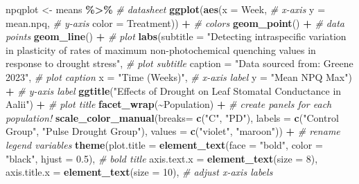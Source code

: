 \documentclass[
]{article}
\newenvironment{Shaded}{\begin{snugshade}}{\end{snugshade}}
\newcommand{\AttributeTok}[1]{\textcolor[rgb]{0.13,0.29,0.53}{#1}}
\newcommand{\CommentTok}[1]{\textcolor[rgb]{0.56,0.35,0.01}{\textit{#1}}}
\newcommand{\DecValTok}[1]{\textcolor[rgb]{0.00,0.00,0.81}{#1}}
\newcommand{\FloatTok}[1]{\textcolor[rgb]{0.00,0.00,0.81}{#1}}
\newcommand{\FunctionTok}[1]{\textcolor[rgb]{0.13,0.29,0.53}{\textbf{#1}}}
\newcommand{\NormalTok}[1]{#1}
\newcommand{\OtherTok}[1]{\textcolor[rgb]{0.56,0.35,0.01}{#1}}
\newcommand{\SpecialCharTok}[1]{\textcolor[rgb]{0.81,0.36,0.00}{\textbf{#1}}}
\newcommand{\StringTok}[1]{\textcolor[rgb]{0.31,0.60,0.02}{#1}}
\begin{document}
\begin{Shaded}
\begin{Highlighting}[]
\NormalTok{npqplot }\OtherTok{\textless{}{-}}\NormalTok{ means }\SpecialCharTok{\%\textgreater{}\%} \CommentTok{\# datasheet}
  \FunctionTok{ggplot}\NormalTok{(}\FunctionTok{aes}\NormalTok{(}\AttributeTok{x =}\NormalTok{ Week, }\CommentTok{\# x{-}axis}
             \AttributeTok{y =}\NormalTok{ mean.npq, }\CommentTok{\# y{-}axis}
             \AttributeTok{color =}\NormalTok{ Treatment)) }\SpecialCharTok{+} \CommentTok{\# colors}
  \FunctionTok{geom\_point}\NormalTok{() }\SpecialCharTok{+}  \CommentTok{\# data points}
  \FunctionTok{geom\_line}\NormalTok{() }\SpecialCharTok{+}  \CommentTok{\# plot}
  \FunctionTok{labs}\NormalTok{(}\AttributeTok{subtitle =} \StringTok{"Detecting intraspecific variation in plasticity of rates of maximum non{-}photochemical quenching values in response to drought stress"}\NormalTok{, }\CommentTok{\# plot subtitle}
       \AttributeTok{caption =} \StringTok{"Data sourced from: Greene 2023"}\NormalTok{, }\CommentTok{\# plot caption}
       \AttributeTok{x =} \StringTok{"Time (Weeks)"}\NormalTok{, }\CommentTok{\# x{-}axis label}
       \AttributeTok{y =} \StringTok{"Mean NPQ Max"}\NormalTok{) }\SpecialCharTok{+} \CommentTok{\# y{-}axis label}
  \FunctionTok{ggtitle}\NormalTok{(}\StringTok{"Effects of Drought on Leaf Stomatal Conductance in \textquotesingle{}A\textquotesingle{}ali\textquotesingle{}i"}\NormalTok{) }\SpecialCharTok{+} \CommentTok{\# plot title}
  \FunctionTok{facet\_wrap}\NormalTok{(}\SpecialCharTok{\textasciitilde{}}\NormalTok{Population) }\SpecialCharTok{+} \CommentTok{\# create panels for each population!}
  \FunctionTok{scale\_color\_manual}\NormalTok{(}\AttributeTok{breaks=} \FunctionTok{c}\NormalTok{(}\StringTok{"C"}\NormalTok{, }\StringTok{"PD"}\NormalTok{), }\AttributeTok{labels =} \FunctionTok{c}\NormalTok{(}\StringTok{"Control Group"}\NormalTok{, }\StringTok{"Pulse Drought Group"}\NormalTok{), }\AttributeTok{values =} \FunctionTok{c}\NormalTok{(}\StringTok{"violet"}\NormalTok{, }\StringTok{"maroon"}\NormalTok{)) }\SpecialCharTok{+} \CommentTok{\# rename legend variables}
  \FunctionTok{theme}\NormalTok{(}\AttributeTok{plot.title =} \FunctionTok{element\_text}\NormalTok{(}\AttributeTok{face =} \StringTok{"bold"}\NormalTok{, }\AttributeTok{color =} \StringTok{"black"}\NormalTok{, }\AttributeTok{hjust =} \FloatTok{0.5}\NormalTok{), }\CommentTok{\# bold title}
        \AttributeTok{axis.text.x =} \FunctionTok{element\_text}\NormalTok{(}\AttributeTok{size =} \DecValTok{8}\NormalTok{), }\AttributeTok{axis.title.x =} \FunctionTok{element\_text}\NormalTok{(}\AttributeTok{size =} \DecValTok{10}\NormalTok{), }\CommentTok{\# adjust x{-}axis labels}

\end{Highlighting}
\end{Shaded}
\end{document}
